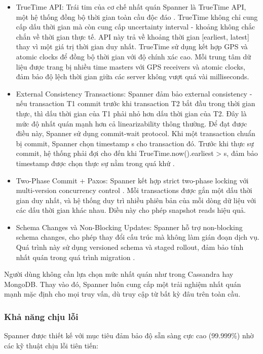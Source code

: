 \documentclass[conference]{IEEEtran}
\begin{document}
\begin{itemize}
    \item TrueTime API: Trái tim của cơ chế nhất quán Spanner là TrueTime API, một hệ thống đồng bộ thời gian toàn cầu độc đáo \cite{brewer2017spanner}. TrueTime không chỉ cung cấp dấu thời gian mà còn cung cấp uncertainty interval - khoảng không chắc chắn về thời gian thực tế. API này trả về khoảng thời gian [earliest, latest] thay vì một giá trị thời gian duy nhất. TrueTime sử dụng kết hợp GPS và atomic clocks để đồng bộ thời gian với độ chính xác cao. Mỗi trung tâm dữ liệu được trang bị nhiều time masters với GPS receivers và atomic clocks, đảm bảo độ lệch thời gian giữa các server không vượt quá vài milliseconds.
    \item External Consistency Transactions: Spanner đảm bảo external consistency - nếu transaction T1 commit trước khi transaction T2 bắt đầu trong thời gian thực, thì dấu thời gian của T1 phải nhỏ hơn dấu thời gian của T2. Đây là mức độ nhất quán mạnh hơn cả linearizability thông thường.
    Để đạt được điều này, Spanner sử dụng commit-wait protocol. Khi một transaction chuẩn bị commit, Spanner chọn timestamp s cho transaction đó. Trước khi thực sự commit, hệ thống phải đợi cho đến khi TrueTime.now().earliest > s, đảm bảo timestamp được chọn thực sự nằm trong quá khứ \cite{gcp}.
    \item Two-Phase Commit + Paxos: Spanner kết hợp strict two-phase locking với multi-version concurrency control \cite{gcp}. Mỗi transactions được gắn một dấu thời gian duy nhất, và hệ thống duy trì nhiều phiên bản của mỗi dòng dữ liệu với các dấu thời gian khác nhau. Điều này cho phép snapshot reads hiệu quả.
    \item Schema Changes và Non-Blocking Updates: Spanner hỗ trợ non-blocking schema changes, cho phép thay đổi cấu trúc mà không làm gián đoạn dịch vụ. Quá trình này sử dụng versioned schema và staged rollout, đảm bảo tính nhất quán trong quá trình migration \cite{gcp}.
\end{itemize}
Người dùng không cần lựa chọn mức nhất quán như trong Cassandra hay MongoDB. Thay vào đó, Spanner luôn cung cấp một trải nghiệm nhất quán mạnh mặc định cho mọi truy vấn, dù truy cập từ bất kỳ đâu trên toàn cầu.
\subsubsection{Khả năng chịu lỗi}
Spanner được thiết kế với mục tiêu đảm bảo độ sẵn sàng cực cao (99.999\%) nhờ các kỹ thuật chịu lỗi tiên tiến:
\end{document}
